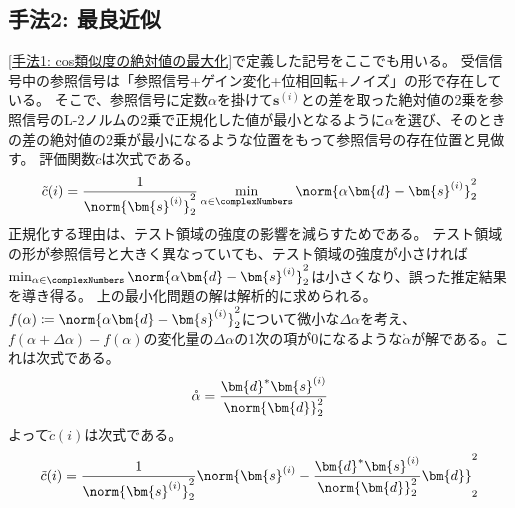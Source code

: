             \subsection{手法2: 最良近似}
                \ref{手法1: cos類似度の絶対値の最大化}で定義した記号をここでも用いる。
                受信信号中の参照信号は「参照信号+ゲイン変化+位相回転+ノイズ」の形で存在している。
                そこで、参照信号に定数$\alpha$を掛けて$\bm{s}^{(i)}$との差を取った絶対値の2乗を参照信号のL-2ノルムの2乗で正規化した値が最小となるように$\alpha$を選び、そのときの差の絶対値の2乗が最小になるような位置をもって参照信号の存在位置と見做す。
                評価関数$\tilde{c}$は次式である。
                \[ \tilde{c}(i) = \frac{1}{\norm{\bm{s}^{(i)}}_2^2}\min_{\alpha \in \complexNumbers}\norm{\alpha\bm{d} - \bm{s}^{(i)}}_2^2 \]
                正規化する理由は、テスト領域の強度の影響を減らすためである。
                テスト領域の形が参照信号と大きく異なっていても、テスト領域の強度が小さければ$\min_{\alpha \in \complexNumbers}\norm{\alpha\bm{d} - \bm{s}^{(i)}}_2^2$は小さくなり、誤った推定結果を導き得る。
                上の最小化問題の解は解析的に求められる。
                $f(\alpha) \coloneqq \norm{\alpha\bm{d} - \bm{s}^{(i)}}_2^2$について微小な$\Delta\alpha$を考え、$f(\alpha+\Delta\alpha) - f(\alpha)$の変化量の$\Delta\alpha$の1次の項が0になるような$\mathring{\alpha}$が解である。これは次式である。
                \[
                    \mathring{\alpha} = \frac{\bm{d}^*\bm{s}^{(i)}}{\norm{\bm{d}}_2^2}
                \]
                よって$\tilde{c}(i)$は次式である。
                \[ \tilde{c}(i) = \frac{1}{\norm{\bm{s}^{(i)}}_2^2}\norm{\bm{s}^{(i)} - \frac{\bm{d}^*\bm{s}^{(i)}}{\norm{\bm{d}}_2^2}\bm{d}}_2^2 \]
